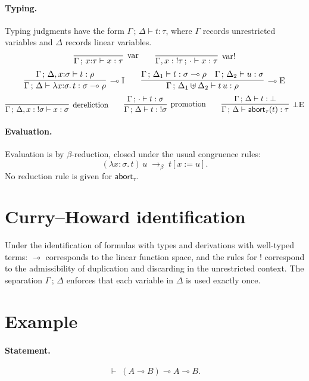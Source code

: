 \paragraph{Typing.}
Typing judgments have the form $\Gamma \,;\, \Delta \vdash t : \tau$, where $\Gamma$ records unrestricted variables and $\Delta$ records linear variables.
\[
\infer[\mathrm{var}]
      {\Gamma \,;\, x{:}\tau \vdash x : \tau}{}
\qquad
\infer[\mathrm{var}!]
      {\Gamma, x:{!}\tau \,;\, \cdot \vdash x : \tau}{}
\]
\[
\infer[\multimap\mathrm{I}]
      {\Gamma \,;\, \Delta \vdash \lambda x{:}\sigma.\, t : \sigma \multimap \rho}
      {\Gamma \,;\, \Delta, x{:}\sigma \vdash t : \rho}
\qquad
\infer[\multimap\mathrm{E}]
      {\Gamma \,;\, \Delta_1 \uplus \Delta_2 \vdash t\,u : \rho}
      {\Gamma \,;\, \Delta_1 \vdash t : \sigma \multimap \rho
       \quad
       \Gamma \,;\, \Delta_2 \vdash u : \sigma}
\]
\[
\infer[\mathrm{dereliction}]
      {\Gamma \,;\, \Delta, x:{!}\sigma \vdash x : \sigma}{}
\qquad
\infer[\mathrm{promotion}]
      {\Gamma \,;\, \Delta \vdash t : {!}\sigma}
      {\Gamma \,;\, \cdot \vdash t : \sigma}
\qquad
\infer[\bot\mathrm{E}]
      {\Gamma \,;\, \Delta \vdash \mathsf{abort}_{\tau}(t) : \tau}
      {\Gamma \,;\, \Delta \vdash t : \bot}
\]

\paragraph{Evaluation.}
Evaluation is by $\beta$-reduction, closed under the usual congruence rules:
\[
(\lambda x{:}\sigma.\, t)\,u \;\to_\beta\; t[x:=u].
\]
No reduction rule is given for $\mathsf{abort}_{\tau}$.

\section{Curry--Howard identification}
\label{sec:ch-linear}
Under the identification of formulas with types and derivations with well-typed terms: $\multimap$ corresponds to the linear function space, and the rules for ${!}$ correspond to the admissibility of duplication and discarding in the unrestricted context. The separation $\Gamma \,;\, \Delta$ enforces that each variable in $\Delta$ is used exactly once.

\section{Example}
\label{sec:example-linear}

\paragraph{Statement.}
\[
\vdash\; (A \multimap B) \multimap A \multimap B.
\]

